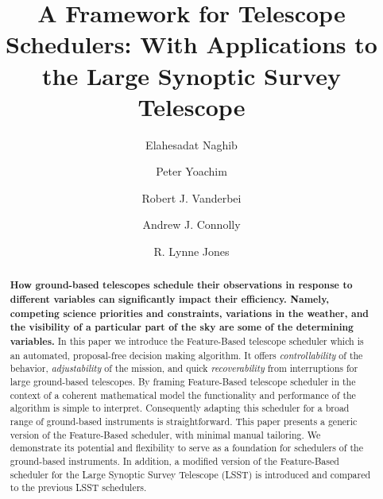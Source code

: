 \documentclass[12pt]{aastex62}
\theoremstyle{definition}
\begin{document}
\title{A Framework for Telescope Schedulers: With Applications to the Large Synoptic Survey Telescope}

\author{Elahesadat Naghib}

\author{Peter Yoachim} 

\author{Robert J. Vanderbei} 

\author{Andrew J. Connolly} 

\author{R. Lynne Jones}



\begin{abstract}
{\bf How ground-based telescopes schedule their observations in response to different variables can significantly impact their efficiency. Namely, competing science priorities and constraints, variations in the weather, and the visibility of a particular part of the sky are some of the determining variables.\bf} In this paper we introduce the Feature-Based telescope scheduler which is an automated, proposal-free decision making algorithm. It offers \textit{controllability} of the behavior, \textit{adjustability} of the mission, and quick \textit{recoverability} from interruptions for large ground-based telescopes. By framing Feature-Based telescope scheduler in the context of a coherent mathematical model the functionality and performance of the algorithm is simple to interpret. Consequently adapting this scheduler for a broad range of ground-based instruments is straightforward. This paper presents a generic version of the Feature-Based scheduler, with minimal manual tailoring. We demonstrate its potential and flexibility to serve as a foundation for schedulers of the ground-based instruments. In addition, a modified version of the Feature-Based scheduler for the Large Synoptic Survey Telescope (LSST) is introduced and compared to the previous LSST schedulers.
\end{abstract}
\end{document}
